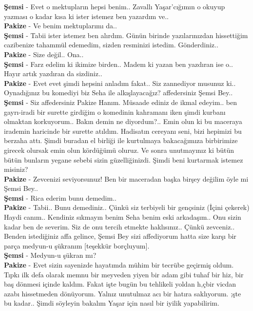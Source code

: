 \documentclass[]{book}
\begin{document}
\textbf{Şemsi} - Evet o mektupların hepsi benim.. Zavallı Yaşar'cığımın o okuyup yazması o kadar kısa ki ister istemez ben yazardım ve..\\
\textbf{Pakize} - Ve benim mektuplarımı da..\\
\textbf{Şemsi} - Tabii ister istemez ben alırdım. Günün birinde yazılarınızdan hissettiğim cazibenize tahammül edemedim, sizden resminizi istedim. Gönderdiniz..\\
\textbf{Pakize} - Size değil.. Ona..\\
\textbf{Şemsi} - Farz edelim ki ikimize birden.. Madem ki yazan ben yazdıran ise o.. Hayır artık yazdıran da sizdiniz..\\
\textbf{Pakize} - Evet evet şimdi hepsini anladım fakat.. Siz zannediyor musunuz ki.. Oynadığınız bu komediyi biz Seha ile alkışlayacağız? affedersiniz Şemsi Bey..\\
\textbf{Şemsi} - Siz affedersiniz Pakize Hanım. Müsaade ediniz de ikmal edeyim.. ben gayrı-iradi bir surette girdiğim o komedinin kahramanı iken şimdi kurbanı olmaktan korkuyorum.. Bakın demin ne diyordum?.. Emin olun ki bu maceraya irademin haricinde bir surette atıldım. Hadisatın cereyanı seni, bizi hepimizi bu berzaha attı. Şimdi buradan el birliği ile kurtulmaya bakacağımıza birbirimize girecek olursak emin olun kördüğümü oluruz. Ve sonra unutmayınız ki bütün bütün bunların yegane sebebi sizin güzelliğinizdi. Şimdi beni kurtarmak istemez misiniz?\\
\textbf{Pakize} - Zevcenizi seviyorsunuz! Ben bir maceradan başka birşey değilim öyle mi Şemsi Bey..\\
\textbf{Şemsi} - Rica ederim bunu demedim..\\
\textbf{Pakize} - Tabii.. Bunu demediniz.. Çünkü siz terbiyeli bir gençsiniz (İçini çekerek) Haydi canım.. Kendiniz sıkmayın benim Seha benim eski arkadaşım.. Onu sizin kadar ben de severim. Siz de onu tercih etmekte haklısınız.. Çünkü zevceniz.. Benden istediğiniz affa gelince, Şemsi Bey sizi affediyorum hatta size karşı bir parça medyun-u şükranım {[}teşekkür borçluyum{]}.\\
\textbf{Şemsi} - Medyun-u şükran mı?\\
\textbf{Pakize} - Evet sizin sayenizde hayatımda mühim bir tecrübe geçirmiş oldum. Tıpkı ilk defa olarak memnu bir meyveden yiyen bir adam gibi tuhaf bir hiz, bir baş dönmesi içinde kaldım. Fakat işte bugün bu tehlikeli yoldan h,çbir vicdan azabı hissetmeden dönüyorum. Yalnız unutulmaz acı bir hatıra saklıyorum. ;şte bu kadar.. Şimdi söyleyin bakalım Yaşar için nasıl bir iyilik yapabilirim.\\
\end{document}
